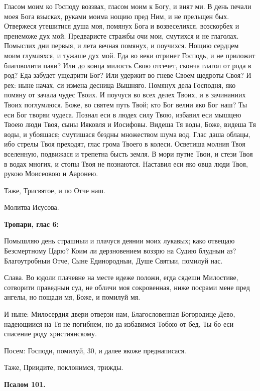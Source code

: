 Гласом моим ко Господу воззвах, гласом моим к Богу, и внят ми. В день печали моея Бога взысках, руками моима нощию пред Ним, и не прельщен бых. Отвержеся утешитися душа моя, помянух Бога и возвеселихся, возскорбех и пренеможе дух мой. Предваристе стражбы очи мои, смутихся и не глаголах. Помыслих дни первыя, и лета вечная помянух, и поучихся. Нощию сердцем моим глумляхся, и тужаше дух мой. Еда во веки отринет Господь, и не приложит благоволити паки? Или до конца милость Свою отсечет, сконча глагол от рода в род? Еда забудет ущедрити Бог? Или удержит во гневе Своем щедроты Своя? И рех: ныне начах, си измена десница Вышняго. Помянух дела Господня, яко помяну от зачала чудес Твоих. И поучуся во всех делех Твоих, и в зачинаниих Твоих поглумлюся. Боже, во святем путь Твой; кто Бог велии яко Бог наш? Ты еси Бог творяи чудеса. Познал еси в людех силу Твою, избавил еси мышцею Твоею люди Твоя, сыны Ияковля и Иосифовы. Видеша Тя воды, Боже, видеша Тя воды, и убояшася; смутишася бездны множеством шума вод. Глас даша облацы, ибо стрелы Твоя преходят, глас грома Твоего в колеси. Осветиша молния Твоя вселенную, подвижася и трепетна бысть земля. В мори путие Твои, и стези Твоя в водах многих, и стопы Твоя не познаются. Наставил еси яко овца люди Твоя, рукою Моисеовою и Ааронею.

Таже, Трисвятое, и по Отче наш.

Молитва Исусова.


\medskip


\bfseries Тропари, глас 6:\normalfont{}


Помышляю день страшныи и плачуся деянии моих лукавых; како отвещаю Безсмертному Царю? Коим ли дерзновением воззрю на Судию блудныи аз? Благоутробныи Отче, Сыне Единородныи, Душе Святыи, помилуй нас.

Слава. Во юдоли плачевне на месте идеже положи, егда сядеши Милостиве, сотворити праведныи суд, не обличи моя сокровенная, ниже посрами мене пред ангелы, но пощади мя, Боже, и помилуй мя.

И ныне: Милосердия двери отверзи нам, Благословенная Богородице Дево, надеющиися на Тя  не  погибнем, но да избавимся Тобою от бед, Ты бо еси спасение роду християнскому.

Посем: Господи, помилуй, 30, и далее якоже преднаписася.

Таже, Приидите, поклонимся, трижды.


\medskip


\bfseries Псалом 101.\normalfont{}


